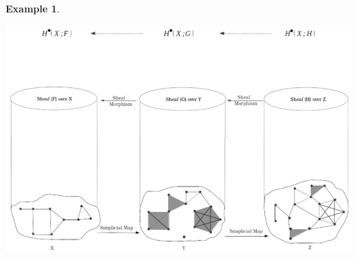 \documentclass[a4paper]{book}
\theoremstyle{definition}
\newtheorem{example}{Example}[section]
\theoremstyle{definition}
\theoremstyle{definition}
\theoremstyle{theorem}
\theoremstyle{definition}
\begin{document}
\begin{example}
\begin{center}
		\includegraphics*[scale =0.37]{SheafCohomBW.png}
	\end{center}  
\end{example}
\end{document}
